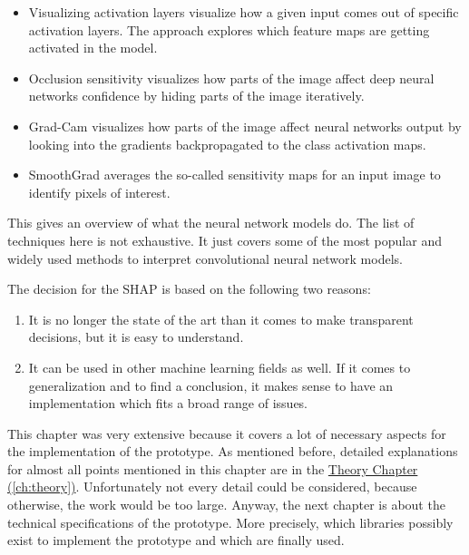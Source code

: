 \begin{itemize}
	\item Visualizing activation layers visualize how a given input comes out of specific activation layers. The approach explores which feature maps are getting activated in the model. 
	\item Occlusion sensitivity visualizes how parts of the image affect deep neural networks confidence by hiding parts of the image iteratively. 
	\item Grad-Cam visualizes how parts of the image affect neural networks output by looking into the gradients backpropagated to the class activation maps.
	\item SmoothGrad averages the so-called sensitivity maps for an input image to identify pixels of interest. 
\end{itemize}

This gives an overview of what the neural network models do. The list of techniques here is not exhaustive. It just covers some of the most popular and widely used methods to interpret convolutional neural network models.  

The decision for the SHAP is based on the following two reasons: 

\begin{enumerate}
	\item It is no longer the state of the art than it comes to make transparent decisions, but it is easy to understand.
	\item It can be used in other machine learning fields as well. If it comes to generalization and to find a conclusion, it makes sense to have an implementation which fits a broad range of issues. 
\end{enumerate}

This chapter was very extensive because it covers a lot of necessary aspects for the implementation of the prototype. As mentioned before, detailed explanations for almost all points mentioned in this chapter are in the \hyperref[ch:theory]{Theory Chapter (\ref{ch:theory})}. Unfortunately not every detail could be considered, because otherwise, the work would be too large. Anyway, the next chapter is about the technical specifications of the prototype. More precisely, which libraries possibly exist to implement the prototype and which are finally used.
